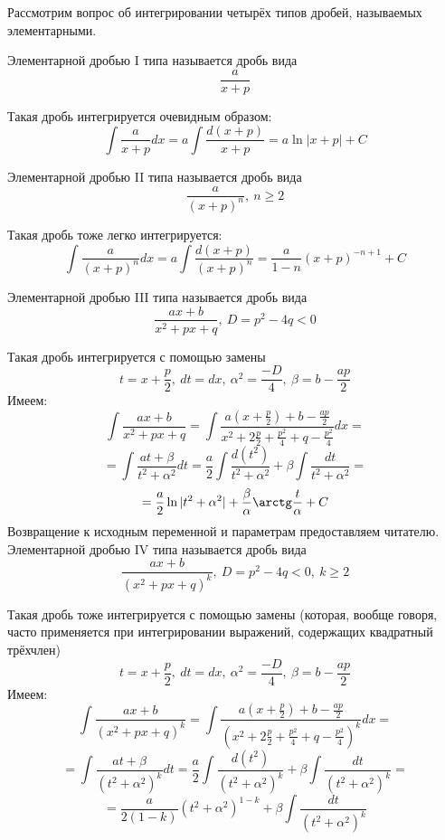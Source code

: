 Рассмотрим вопрос об интегрировании четырёх типов дробей, называемых элементарными.

\opred
Элементарной дробью I типа называется дробь вида
\begin{equation}\label{elem_drob_I}
\frac{a}{x+p}
\end{equation}

Такая дробь интегрируется очевидным образом:
$$
\int\frac{a}{x+p}dx=a\int\frac{d(x+p)}{x+p}=a\ln|x+p|+C
$$

\opred
Элементарной дробью II типа называется дробь вида
\begin{equation}\label{elem_drob_II}
\frac{a}{(x+p)^n},~n\geq 2
\end{equation}

Такая дробь тоже легко интегрируется:
$$
\int\frac{a}{(x+p)^n}dx=a\int\frac{d(x+p)}{(x+p)^n}=\frac{a}{1-n}(x+p)^{-n+1}+C
$$

\opred
Элементарной дробью III типа называется дробь вида
\begin{equation}\label{elem_drob_III}
\frac{ax+b}{x^2+px+q},~ D=p^2-4q<0
\end{equation}

Такая дробь интегрируется с помощью замены
\begin{equation}
t=x+\frac{p}{2},~ dt=dx, ~ \alpha^2=\frac{-D}{4}, ~\beta=b-\frac{ap}{2}
\end{equation}
Имеем:
$$
\int \frac{ax+b}{x^2+px+q}=\int\frac{a\left(x+\frac{p}{2}\right)+b-\frac{ap}{2}}{x^2+2\frac{p}{2}+\frac{p^2}{4}+q-\frac{p^2}{4}}dx=$$$$=
\int\frac{at+\beta}{t^2+\alpha^2}dt=\frac{a}{2}\int\frac{d(t^2)}{t^2+\alpha^2}+\beta\int\frac{dt}{t^2+\alpha^2}=$$$$=\frac{a}{2}\ln|t^2+\alpha^2|+\frac{\beta}{\alpha}\arctg\frac{t}{\alpha}+C
$$
Возвращение к исходным переменной и параметрам предоставляем читателю.
\opred
Элементарной дробью IV типа называется дробь вида
\begin{equation}\label{elem_drob_IV}
\frac{ax+b}{(x^2+px+q)^k},~ D=p^2-4q<0,~k\geq 2
\end{equation}

Такая дробь тоже интегрируется с помощью замены (которая, вообще говоря, часто применяется при интегрировании выражений, содержащих квадратный трёхчлен)
\begin{equation}
t=x+\frac{p}{2},~ dt=dx, ~ \alpha^2=\frac{-D}{4}, ~\beta=b-\frac{ap}{2}
\end{equation}
Имеем:
$$
\int \frac{ax+b}{(x^2+px+q)^k}=
\int
	\frac	{a\left(x+\frac{p}{2}\right)+b-\frac{ap}{2}}
		{\left(x^2+2\frac{p}{2}+\frac{p^2}{4}+q-\frac{p^2}{4}\right)^k}
dx=
$$$$=
\int\frac{at+\beta}{(t^2+\alpha^2)^k}dt=
\frac{a}{2}\int\frac{d(t^2)}{(t^2+\alpha^2)^k}+\beta\int\frac{dt}{(t^2+\alpha^2)^k}=
$$$$=
\frac{a}{2(1-k)}(t^2+\alpha^2)^{1-k}+\beta\int\frac{dt}{(t^2+\alpha^2)^k}
$$

